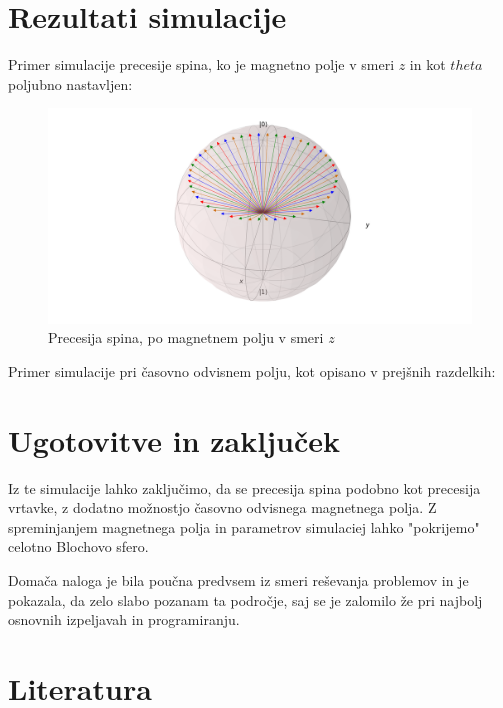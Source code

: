 \documentclass[12pt, a4paper]{article}
\begin{document}
\section{Rezultati simulacije}
Primer simulacije precesije spina, ko je magnetno polje v smeri $z$ in kot $theta$ poljubno nastavljen:
\begin{figure}[H]
  \includegraphics[width=500pt]{precesija_po_osi_z}
  \caption{Precesija spina, po magnetnem polju v smeri $z$}
  \label{fig:boat1}
\end{figure}
Primer simulacije pri časovno odvisnem polju, kot opisano v prejšnih razdelkih:
\section{Ugotovitve in zaključek}
Iz te simulacije lahko zaključimo, da se precesija spina podobno kot precesija vrtavke, z dodatno možnostjo časovno odvisnega magnetnega polja. Z spreminjanjem magnetnega polja in parametrov simulaciej lahko "pokrijemo" celotno Blochovo sfero.

Domača naloga je bila poučna predvsem iz smeri reševanja problemov in je pokazala, da zelo slabo pozanam ta področje, saj se je zalomilo že pri najbolj osnovnih izpeljavah in programiranju.

\section{Literatura}
\end{document}
